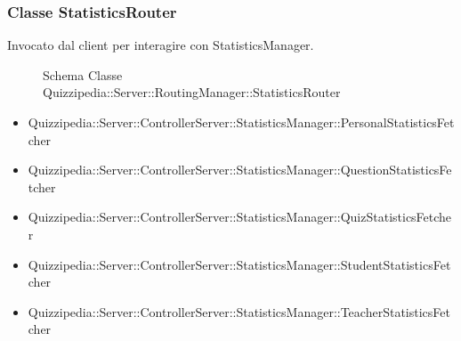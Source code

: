 \subsubsection{Classe StatisticsRouter}
Invocato dal client per interagire con StatisticsManager.
\begin{figure}[H]
\centering
\noindent{}
\caption[Schema Classe StatisticsRouter]{Schema Classe Quizzipedia::Server::RoutingManager::StatisticsRouter}
\end{figure}
\begin{itemize}
\item Quizzipedia::Server::ControllerServer::StatisticsManager::PersonalStatisticsFetcher
\item Quizzipedia::Server::ControllerServer::StatisticsManager::QuestionStatisticsFetcher
\item Quizzipedia::Server::ControllerServer::StatisticsManager::QuizStatisticsFetcher
\item Quizzipedia::Server::ControllerServer::StatisticsManager::StudentStatisticsFetcher
\item Quizzipedia::Server::ControllerServer::StatisticsManager::TeacherStatisticsFetcher
\end{itemize}
